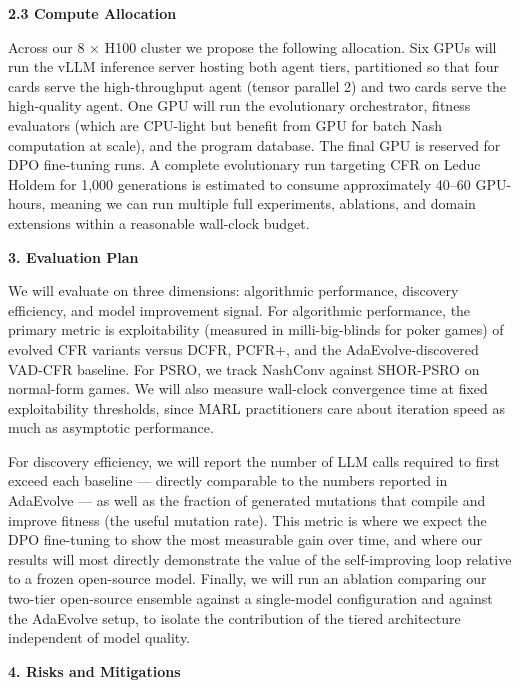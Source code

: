 \textbf{2.3 Compute Allocation}

Across our 8 × H100 cluster we propose the following allocation. Six
GPUs will run the vLLM inference server hosting both agent tiers,
partitioned so that four cards serve the high-throughput agent (tensor
parallel 2) and two cards serve the high-quality agent. One GPU will run
the evolutionary orchestrator, fitness evaluators (which are CPU-light
but benefit from GPU for batch Nash computation at scale), and the
program database. The final GPU is reserved for DPO fine-tuning runs. A
complete evolutionary run targeting CFR on Leduc Hold\textquotesingle em
for 1,000 generations is estimated to consume approximately 40--60
GPU-hours, meaning we can run multiple full experiments, ablations, and
domain extensions within a reasonable wall-clock budget.

\textbf{3. Evaluation Plan}

We will evaluate on three dimensions: algorithmic performance, discovery
efficiency, and model improvement signal. For algorithmic performance,
the primary metric is exploitability (measured in milli-big-blinds for
poker games) of evolved CFR variants versus DCFR, PCFR+, and the
AdaEvolve-discovered VAD-CFR baseline. For PSRO, we track NashConv
against SHOR-PSRO on normal-form games. We will also measure wall-clock
convergence time at fixed exploitability thresholds, since MARL
practitioners care about iteration speed as much as asymptotic
performance.

For discovery efficiency, we will report the number of LLM calls
required to first exceed each baseline --- directly comparable to the
numbers reported in AdaEvolve --- as well as the fraction of generated
mutations that compile and improve fitness (the \textquotesingle useful
mutation rate\textquotesingle). This metric is where we expect the DPO
fine-tuning to show the most measurable gain over time, and where our
results will most directly demonstrate the value of the self-improving
loop relative to a frozen open-source model. Finally, we will run an
ablation comparing our two-tier open-source ensemble against a
single-model configuration and against the AdaEvolve setup, to isolate
the contribution of the tiered architecture independent of model
quality.

\textbf{4. Risks and Mitigations}

